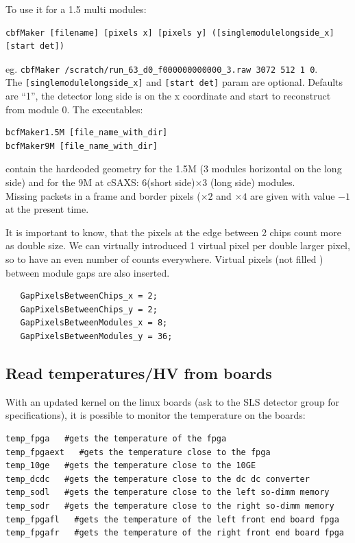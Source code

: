 \documentclass{article}
\begin{document}
To use it for a 1.5 multi modules:
\begin{verbatim}
cbfMaker [filename] [pixels x] [pixels y] ([singlemodulelongside_x] [start det])
\end{verbatim}
eg.
{\tt cbfMaker /scratch/run\_63\_d0\_f000000000000\_3.raw  3072 512 1 0}.\\
The {\tt{[singlemodulelongside\_x]}} and {\tt{[start det]}} param are optional. Defaults are ``1'', the detector long side is on the x coordinate and start to reconstruct from module 0. 
The executables: 
\begin{verbatim}
bcfMaker1.5M [file_name_with_dir]
bcfMaker9M [file_name_with_dir]
\end{verbatim}
contain the hardcoded geometry for the 1.5M (3 modules horizontal on the long side) and for the 9M at cSAXS: 6(short side)$\times$3 (long side) modules.\\ 
Missing packets in a frame and border pixels ($\times 2$ and $\times 4$ are given with value $-1$ at the present time.

It is important to know, that the pixels at the edge between 2 chips count more as double size. We can virtually introduced 1 virtual pixel per double larger pixel, so to have an even number of counts everywhere. Virtual pixels (not filled ) between module gaps are also inserted.

 \begin{verbatim}
   GapPixelsBetweenChips_x = 2;
   GapPixelsBetweenChips_y = 2;
   GapPixelsBetweenModules_x = 8;
   GapPixelsBetweenModules_y = 36;
 \end{verbatim}

\subsection{Read temperatures/HV from boards}

With an updated kernel on the linux boards (ask to the SLS detector group for specifications), it is possible to monitor the temperature on the boards: 
\begin{verbatim}
temp_fpga   #gets the temperature of the fpga
temp_fpgaext   #gets the temperature close to the fpga
temp_10ge   #gets the temperature close to the 10GE
temp_dcdc   #gets the temperature close to the dc dc converter
temp_sodl   #gets the temperature close to the left so-dimm memory
temp_sodr   #gets the temperature close to the right so-dimm memory
temp_fpgafl   #gets the temperature of the left front end board fpga
temp_fpgafr   #gets the temperature of the right front end board fpga

\end{verbatim}
\end{document}

